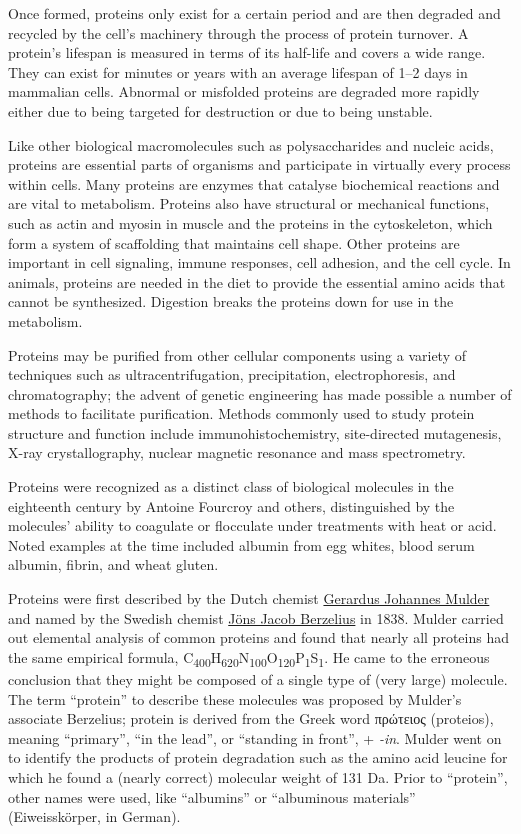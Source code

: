 Once formed, proteins only exist for a certain period and are then
degraded and recycled by the cell's machinery through the process of
protein turnover. A protein's lifespan is measured in terms of its
half-life and covers a wide range. They can exist for minutes or years
with an average lifespan of 1--2 days in mammalian cells. Abnormal or
misfolded proteins are degraded more rapidly either due to being
targeted for destruction or due to being unstable.

Like other biological macromolecules such as polysaccharides and nucleic
acids, proteins are essential parts of organisms and participate in
virtually every process within cells. Many proteins are enzymes that
catalyse biochemical reactions and are vital to metabolism. Proteins
also have structural or mechanical functions, such as actin and myosin
in muscle and the proteins in the cytoskeleton, which form a system of
scaffolding that maintains cell shape. Other proteins are important in
cell signaling, immune responses, cell adhesion, and the cell cycle. In
animals, proteins are needed in the diet to provide the essential amino
acids that cannot be synthesized. Digestion breaks the proteins down for
use in the metabolism.

Proteins may be purified from other cellular components using a variety
of techniques such as ultracentrifugation, precipitation,
electrophoresis, and chromatography; the advent of genetic engineering
has made possible a number of methods to facilitate purification.
Methods commonly used to study protein structure and function include
immunohistochemistry, site-directed mutagenesis, X-ray crystallography,
nuclear magnetic resonance and mass spectrometry.

Proteins were recognized as a distinct class of biological molecules in
the eighteenth century by Antoine Fourcroy and others, distinguished by
the molecules' ability to coagulate or flocculate under treatments with
heat or acid. Noted examples at the time included albumin from egg
whites, blood serum albumin, fibrin, and wheat gluten.

Proteins were first described by the Dutch chemist
\href{https://en.wikipedia.org/wiki/Gerardus_Johannes_Mulder}{Gerardus
Johannes Mulder} and named by the Swedish chemist
\href{https://en.wikipedia.org/wiki/Jöns_Jacob_Berzelius}{Jöns Jacob
Berzelius} in 1838. Mulder carried out elemental analysis of common
proteins and found that nearly all proteins had the same empirical
formula,
C\textsubscript{400}H\textsubscript{620}N\textsubscript{100}O\textsubscript{120}P\textsubscript{1}S\textsubscript{1}.
He came to the erroneous conclusion that they might be composed of a
single type of (very large) molecule. The term ``protein'' to describe
these molecules was proposed by Mulder's associate Berzelius; protein is
derived from the Greek word πρώτειος (proteios), meaning ``primary'',
``in the lead'', or ``standing in front'', + \emph{-in}. Mulder went on
to identify the products of protein degradation such as the amino acid
leucine for which he found a (nearly correct) molecular weight of 131
Da. Prior to ``protein'', other names were used, like ``albumins'' or
``albuminous materials'' (Eiweisskörper, in German).

